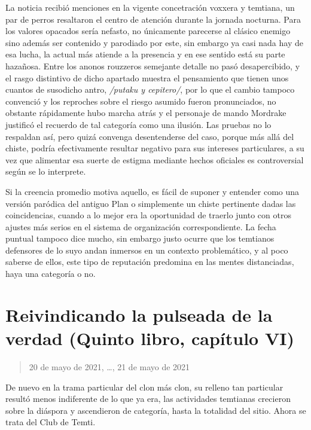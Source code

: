 \documentclass[
]{book}
\begin{document}
La noticia recibió menciones en la vigente concetración voxxera y temtiana, un par de perros resaltaron el centro de atención durante la jornada nocturna. Para los valores opacados sería nefasto, no únicamente parecerse al clásico enemigo sino además ser contenido y parodiado por este, sin embargo ya casi nada hay de esa lucha, la actual más atiende a la presencia y en ese sentido está su parte hazañosa. Entre los anonos rouzzeros semejante detalle no pasó desapercibido, y el rasgo distintivo de dicho apartado muestra el pensamiento que tienen unos cuantos de susodicho antro, \emph{/putaku y cepitero/}, por lo que el cambio tampoco convenció y los reproches sobre el riesgo asumido fueron pronunciados, no obstante rápidamente hubo marcha atrás y el personaje de mando Mordrake justificó el recuerdo de tal categoría como una ilusión. Las pruebas no lo respaldan así, pero quizá convenga desentenderse del caso, porque más allá del chiste, podría efectivamente resultar negativo para sus intereses particulares, a su vez que alimentar esa suerte de estigma mediante hechos oficiales es controversial según se lo interprete.

Si la creencia promedio motiva aquello, es fácil de suponer y entender como una versión paródica del antiguo Plan o simplemente un chiste pertinente dadas las coincidencias, cuando a lo mejor era la oportunidad de traerlo junto con otros ajustes más serios en el sistema de organización correspondiente. La fecha puntual tampoco dice mucho, sin embargo justo ocurre que los temtianos defensores de lo suyo andan inmersos en un contexto problemático, y al poco saberse de ellos, este tipo de reputación predomina en las mentes distanciadas, haya una categoría o no.

\hypertarget{reivindicando-la-pulseada-de-la-verdad-quinto-libro-capuxedtulo-vi}{%
\section{Reivindicando la pulseada de la verdad (Quinto libro, capítulo VI)}\label{reivindicando-la-pulseada-de-la-verdad-quinto-libro-capuxedtulo-vi}}

\begin{quote}
20 de mayo de 2021, \ldots, 21 de mayo de 2021
\end{quote}

De nuevo en la trama particular del clon más clon, su relleno tan particular resultó menos indiferente de lo que ya era, las actividades temtianas crecieron sobre la diáspora y ascendieron de categoría, hasta la totalidad del sitio. Ahora se trata del Club de Temti.
\end{document}
